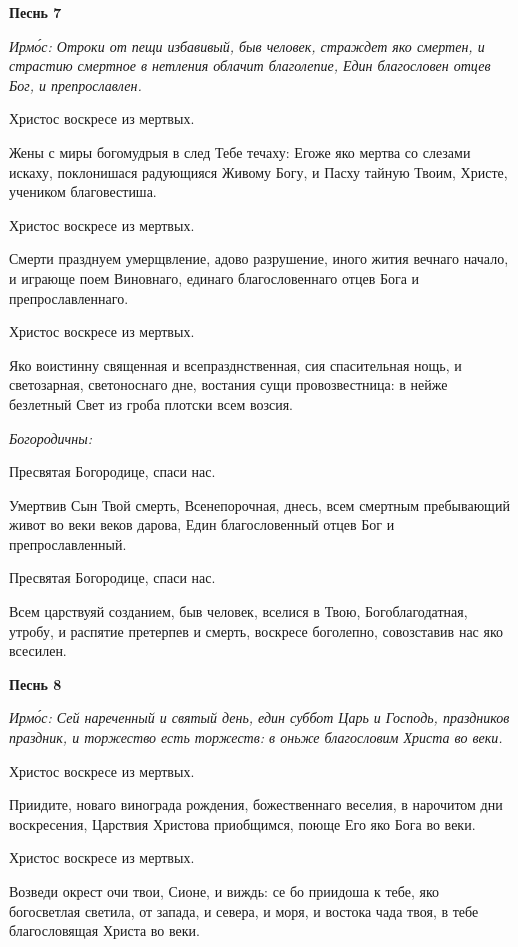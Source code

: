 \bfseries Песнь 7\normalfont{}


\itshape Ирмо́с:\normalfont{} Отроки от пещи избавивый, быв человек, страждет яко смертен, и страстию смертное в нетления облачит благолепие, Един благословен отцев Бог, и препрославлен.


Христос воскресе из мертвых.


Жены с миры богомудрыя в след Тебе течаху: Егоже яко мертва со слезами искаху, поклонишася радующияся Живому Богу, и Пасху тайную Твоим, Христе, учеником благовестиша.


Христос воскресе из мертвых.


Смерти празднуем умерщвление, адово разрушение, иного жития вечнаго начало, и играюще поем Виновнаго, единаго благословеннаго отцев Бога и препрославленнаго.


Христос воскресе из мертвых.


Яко воистинну священная и всепразднственная, сия спасительная нощь, и светозарная, светоноснаго дне, востания сущи провозвестница: в нейже безлетный Свет из гроба плотски всем возсия.


\itshape Богородичны:

\normalfont{}


Пресвятая Богородице, спаси нас.


Умертвив Сын Твой смерть, Всенепорочная, днесь, всем смертным пребывающий живот во веки веков дарова, Един благословенный отцев Бог и препрославленный.


Пресвятая Богородице, спаси нас.


Всем царствуяй созданием, быв человек, вселися в Твою, Богоблагодатная, утробу, и распятие претерпев и смерть, воскресе боголепно, совозставив нас яко всесилен.





\bfseries Песнь 8\normalfont{}


\itshape Ирмо́с:\normalfont{} Сей нареченный и святый день, един суббот Царь и Господь, праздников праздник, и торжество есть торжеств: в оньже благословим Христа во веки.


Христос воскресе из мертвых.


Приидите, новаго винограда рождения, божественнаго веселия, в нарочитом дни воскресения, Царствия Христова приобщимся, поюще Его яко Бога во веки.


Христос воскресе из мертвых.


Возведи окрест очи твои, Сионе, и виждь: се бо приидоша к тебе, яко богосветлая светила, от запада, и севера, и моря, и востока чада твоя, в тебе благословящая Христа во веки.


